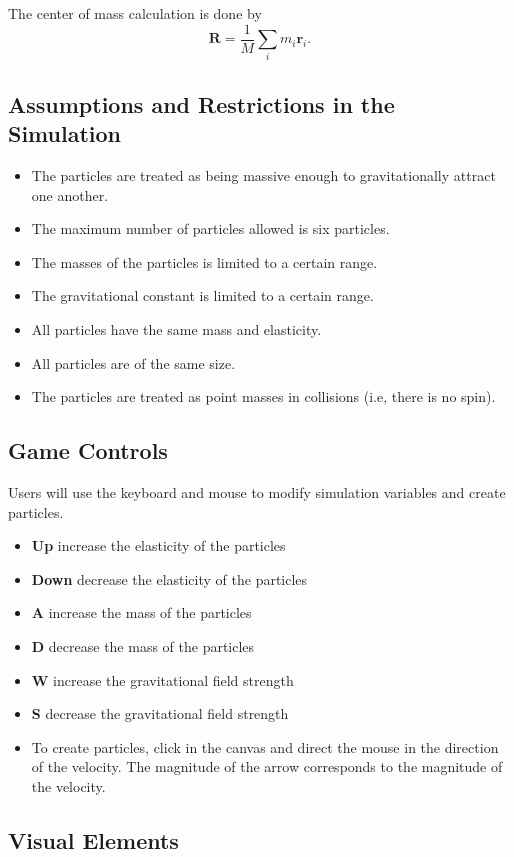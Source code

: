 \documentclass{article}
\renewcommand{\vec}{\mathbf}
\begin{document}
The center of mass calculation is done by
\[\vec{R}=\frac{1}{M}\sum_im_i\vec{r}_i.\]

\subsection*{Assumptions and Restrictions in the Simulation}

\begin{itemize}
	\item The particles are treated as being massive enough to gravitationally attract one another.
	\item The maximum number of particles allowed is six particles.
	\item The masses of the particles is limited to a certain range.
	\item The gravitational constant is limited to a certain range.
	\item All particles have the same mass and elasticity.
	\item All particles are of the same size.
	\item The particles are treated as point masses in collisions (i.e, there is no spin).
\end{itemize}

\subsection*{Game Controls}

Users will use the keyboard and mouse to modify simulation variables and create particles.
\begin{itemize}
	\item \textbf{Up} increase the elasticity of the particles
	\item \textbf{Down} decrease the elasticity of the particles
	\item \textbf{A} increase the mass of the particles
	\item \textbf{D} decrease the mass of the particles
	\item \textbf{W} increase the gravitational field strength
	\item \textbf{S} decrease the gravitational field strength
	\item To create particles, click in the canvas and direct the mouse in the direction of the velocity. The magnitude of the arrow corresponds to the magnitude of the velocity.
\end{itemize}

\subsection*{Visual Elements}
\end{document}

